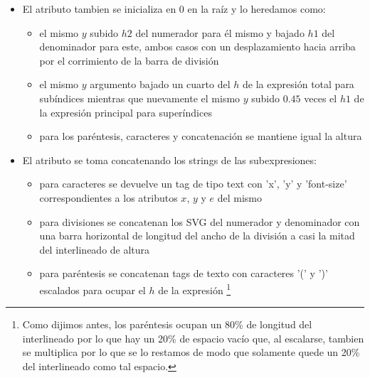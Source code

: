 \begin{itemize}
	\item El atributo \textbf{} tambien se inicializa en 0 en la raíz y lo heredamos como:
	\begin{itemize}
		\item el mismo $y$ subido $h2$ del numerador para él mismo y bajado $h1$ del denominador para este, ambos casos con un desplazamiento hacia arriba por el corrimiento de la barra de división
		\item el mismo $y$ argumento bajado un cuarto del $h$ de la expresión total para subíndices mientras que nuevamente el mismo $y$ subido $0.45$ veces el $h1$ de la expresión principal para superíndices
		\item para los paréntesis, caracteres y concatenación se mantiene igual la altura
	\end{itemize}

	\item El atributo \textbf{} se toma concatenando los strings de las subexpresiones:
	\begin{itemize}
		\item para caracteres se devuelve un tag de tipo text con 'x', 'y' y 'font-size' correspondientes a los atributos $x$, $y$ y $e$ del mismo
		\item para divisiones se concatenan los SVG del numerador y denominador con una barra horizontal de longitud del ancho de la división a casi la mitad del interlineado de altura
		\item para paréntesis se concatenan tags de texto con caracteres '(' y ')' escalados para ocupar el $h$ de la expresión \footnote{Como dijimos antes, los paréntesis ocupan un 80\% de longitud del interlineado por lo que hay un 20\% de espacio vacío que, al escalarse, tambien se multiplica por lo que se lo restamos de modo que solamente quede un 20\% del interlineado como tal espacio.}
	\end{itemize}
\end{itemize}
